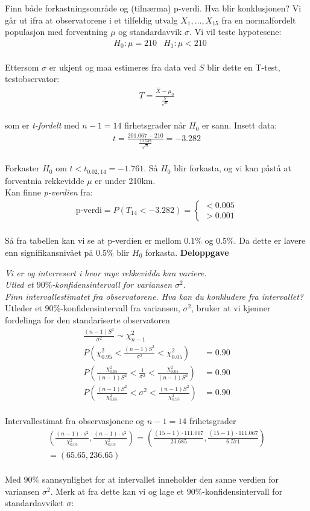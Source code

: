 \documentclass[final,hyperref={pdfpagelabels=false}]{beamer}
\newcommand{\deloppgave}[2]
{\footnotesize\center\textbf{Deloppgave}\\ \raggedright \textit{#1}\\#2\\}
\newcommand{\maths}[1]{\vspace{-3mm}\begin{align*}#1\end{align*}\\\vspace{-3mm}}
\begin{document}
\begin{frame}{}
\begin{columns}[t]
\begin{column}{.33\linewidth}
\begin{block}{}
{					Finn både forkastningsområde og (tilnærma) p-verdi.
					Hva blir konklusjonen?}
				{Vi går ut ifra at observatorene i et tilfeldig utvalg $X_1,\ldots,X_{15}$ fra en normalfordelt populasjon med forventning $\mu$ og standardavvik $\sigma$.
					Vi vil teste hypotesene:
					\maths{&H_0: \mu=210 &H_1:\mu<210}
					Ettersom $\sigma$ er ukjent og maa estimeres fra data ved $S$ blir dette en T-test, testobservator:
					\maths{T=\frac{\overline X - \mu_0}{\frac{S}{\sqrt n}}}
					som er \textit{t-fordelt} med $n-1=14$ firhetsgrader når $H_0$ er sann.
					Insett data:
					\maths{t=\frac{201.067-210}{\frac{10.539}{\sqrt n}}=-3.282}
					Forkaster $H_0$ om $t<t_{0.02,14}=-1.761$. Så $H_0$ blir forkasta, og vi kan påstå at forventnia rekkevidde $\mu$ er under 210km.\\
					Kan finne \textit{p-verdien} fra:
					\maths{\text{p-verdi}=P(T_{14}<-3.282)=\begin{cases}
							<0.005\\
							>0.001
						\end{cases}}
					Så fra tabellen kan vi se at p-verdien er mellom $0.1\%$ og $0.5\%$.
					Da dette er lavere enn signifikansnivået på $0.5\%$ blir $H_0$ forkasta.}
				\deloppgave{Vi er og interresert i hvor mye rekkevidda kan variere.\\
					Utled et $90\%$-konfidensintervall for variansen $\sigma^2$.\\
					Finn intervallestimatet fra observatorene. Hva kan du konkludere fra intervallet?}{Utleder et $90\%$-konfidensintervall fra variansen, $\sigma^2$, bruker at vi kjenner fordelinga for den standariserte observatoren
					\maths{\frac{(n-1)S^2}{\sigma^2}\sim \chi_{n-1}^2&\\
						P\left(\chi_{0.95}^2<\frac{(n-1)S^2}{\sigma^2}<\chi_{0.05}^2\right)&=0.90\\
						P\left(\frac{\chi_{0.95}^2}{(n-1)S^2}<\frac{1}{\sigma^2}<\frac{\chi_{0.05}^2}{(n-1)S^2}\right)&=0.90\\
						P\left(\frac{(n-1)S^2}{\chi_{0.05}^2}<\sigma^2<\frac{(n-1)S^2}{\chi_{0.95}^2}\right)&=0.90}
					Intervallestimat fra observasjonene og $n-1=14$ frihetsgrader
					\maths{\left(\frac{(n-1)\cdot s^2}{\chi_{0.05}^2},\frac{(n-1)\cdot s^2}{\chi_{0.05}^2}\right) = \left(\frac{(15-1)\cdot 111.067}{23.685},\frac{(15-1)\cdot 111.067}{6.571}\right)\\=(65.65,236.65)}
					Med $90\%$ sannsynlighet for at intervallet inneholder den sanne verdien for variansen $\sigma^2$.
					Merk at fra dette kan vi og lage et $90\%$-konfidensintervall for standardavviket $\sigma$:
}
\end{block}
\end{column}
\end{columns}
\end{frame}
\end{document}
